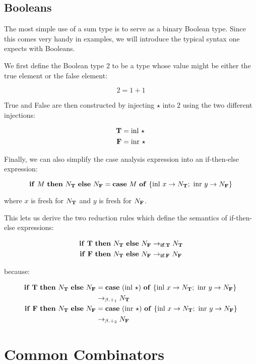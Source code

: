 \subsection{Booleans}
\label{ssec:booleans}

The most simple use of a sum type is to serve as a binary Boolean
type. Since this comes very handy in examples, we will introduce the
typical syntax one expects with Booleans.

We first define the Boolean type $2$ to be a type whose value might be
either the true element or the false element:

$$
2 = 1 + 1
$$

True and False are then constructed by injecting $\star$ into $2$ using the
two different injections:

\begin{align*}
  \textbf{T} &= \operatorname{inl}\,\star \\
  \textbf{F} &= \operatorname{inr}\,\star
\end{align*}

Finally, we can also simplify the case analysis expression into an
if-then-else expression:

$$
\text{\textbf{if} $M$ \textbf{then} $N_{\textbf{T}}$ \textbf{else} $N_{\textbf{F}}$} = \text{\textbf{case} $M$ \textbf{of} $\{ \operatorname{inl}\,x \to N_{\textbf{T}};\ \operatorname{inr}\,y \to N_{\textbf{F}} \}$}
$$

where $x$ is fresh for $N_{\textbf{T}}$ and $y$ is fresh for $N_{\textbf{F}}$.

This lets us derive the two reduction rules which define the semantics of
if-then-else expressions:

\begin{align*}
  \text{\textbf{if} $\textbf{T}$ \textbf{then} $N_{\textbf{T}}$ \textbf{else} $N_{\textbf{F}}$} &\to_{\textbf{if}.\textbf{T}} N_{\textbf{T}} \\
  \text{\textbf{if} $\textbf{F}$ \textbf{then} $N_{\textbf{T}}$ \textbf{else} $N_{\textbf{F}}$} &\to_{\textbf{if}.\textbf{F}} N_{\textbf{F}}
\end{align*}

because:

\begin{align*}
  \text{\textbf{if} $\textbf{T}$ \textbf{then} $N_{\textbf{T}}$ \textbf{else} $N_{\textbf{F}}$}
  &= \text{\textbf{case} $(\operatorname{inl}\,\star)$ \textbf{of} $\{ \operatorname{inl}\,x \to N_{\textbf{T}};\ \operatorname{inr}\,y \to N_{\textbf{F}} \}$} \\
  &\to_{\beta.+_1} N_{\textbf{T}} \\
  \text{\textbf{if} $\textbf{F}$ \textbf{then} $N_{\textbf{T}}$ \textbf{else} $N_{\textbf{F}}$}
  &= \text{\textbf{case} $(\operatorname{inr}\,\star)$ \textbf{of} $\{ \operatorname{inl}\,x \to N_{\textbf{T}};\ \operatorname{inr}\,y \to N_{\textbf{F}} \}$} \\
  &\to_{\beta.+_2} N_{\textbf{F}}
\end{align*}


\section{Common Combinators}
\label{sec:common-combinators}

